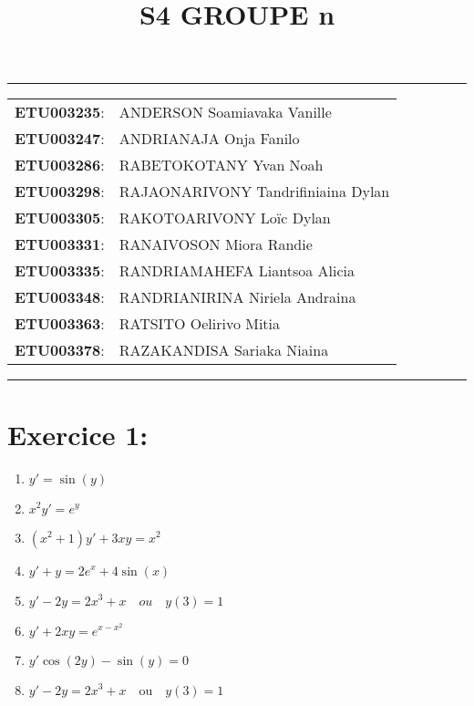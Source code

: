 \documentclass[a4paper,12pt]{article}
\begin{document}
	
\title{\textbf{S4 GROUPE n}}
\date{}
\maketitle

\hrule
\vspace{1em}

\begin{tabular}{rl}
	\textbf{ETU003235}: & ANDERSON Soamiavaka Vanille \\
	\textbf{ETU003247}: & ANDRIANAJA Onja Fanilo \\
	\textbf{ETU003286}: & RABETOKOTANY Yvan Noah \\
	\textbf{ETU003298}: & RAJAONARIVONY Tandrifiniaina Dylan \\
	\textbf{ETU003305}: & RAKOTOARIVONY Loïc Dylan \\
	\textbf{ETU003331}: & RANAIVOSON Miora Randie \\
	\textbf{ETU003335}: & RANDRIAMAHEFA Liantsoa Alicia \\
	\textbf{ETU003348}: & RANDRIANIRINA Niriela Andraina \\
	\textbf{ETU003363}: & RATSITO Oelirivo Mitia \\
	\textbf{ETU003378}: & RAZAKANDISA Sariaka Niaina \\
\end{tabular}

\vspace{1em}
\hrule

\newpage
\section*{Exercice 1:}
\begin{enumerate}
	\item $y' = \sin(y)$ \\

	\item $x^2 y' = e^y$ \\
	

	\item $(x^2 + 1) y' + 3xy = x^2$ \\
	
		
	\item $y' + y = 2e^x + 4 \sin(x)$ \\
	
	
	\item $y' - 2y = 2x^3 + x \quad ou \quad y(3)=1$

	\item $y' + 2xy = e^{x-x^2}$

	\item $y' \cos(2y) - \sin(y) = 0$

	\item $y' - 2y = 2x^3 + x \quad \text{ou} \quad y(3)=1$
\end{enumerate}
\end{document}

